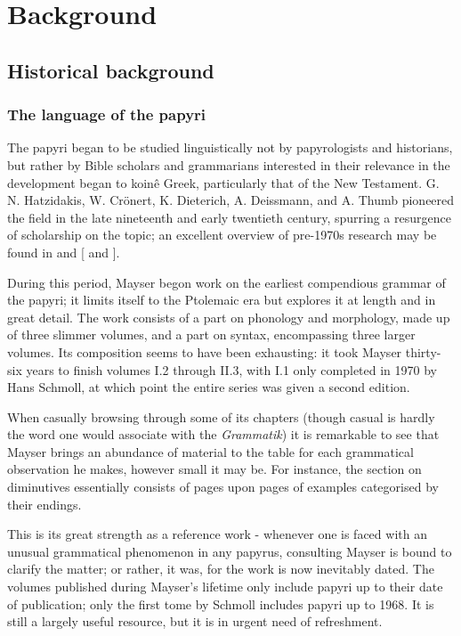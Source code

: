 
\chapter{Background}
\label{chp:background} %

\section{Historical background}
\subsection{The language of the papyri}

The papyri began to be studied linguistically not by papyrologists and
historians, but rather by Bible scholars and grammarians interested in
their relevance in the development began to koin\^{e} Greek,
particularly that of the New Testament. G. N.  Hatzidakis,
W. Cr\"onert, K. Dieterich, A. Deissmann, and A.  Thumb pioneered the
field in the late nineteenth and early twentieth century, spurring a
resurgence of scholarship on the topic; an excellent overview of
pre-1970s research may be found in \citet{mandilaras1973} and
\citeauthor{gignac1976} [\citeyear{gignac1976} and
\citeyear{gignac1981}].

During this period, Mayser begon work on the earliest compendious
grammar of the papyri; it limits itself to the Ptolemaic era but
explores it at length and in great detail.  The work consists of a
part on phonology and morphology, made up of three slimmer volumes,
and a part on syntax, encompassing three larger volumes. Its
composition seems to have been exhausting: it took Mayser thirty-six
years to finish volumes I.2 through II.3, with I.1 only completed in
1970 by Hans Schmoll, at which point the entire series was given a
second edition.

When casually browsing through some of its chapters (though casual is
hardly the word one would associate with the \textit{Grammatik}) it is
remarkable to see that Mayser brings an abundance of material to the
table for each grammatical observation he makes, however small it may
be. For instance, the section on diminutives essentially consists of
pages upon pages of examples categorised by their endings.

This is its great strength as a reference work - whenever one is faced
with an unusual grammatical phenomenon in any papyrus, consulting
Mayser is bound to clarify the matter; or rather, it was, for the work
is now inevitably dated.  The volumes published during Mayser's
lifetime only include papyri up to their date of publication; only the
first tome by Schmoll includes papyri up to 1968.  It is still a
largely useful resource, but it is in urgent need of refreshment.

